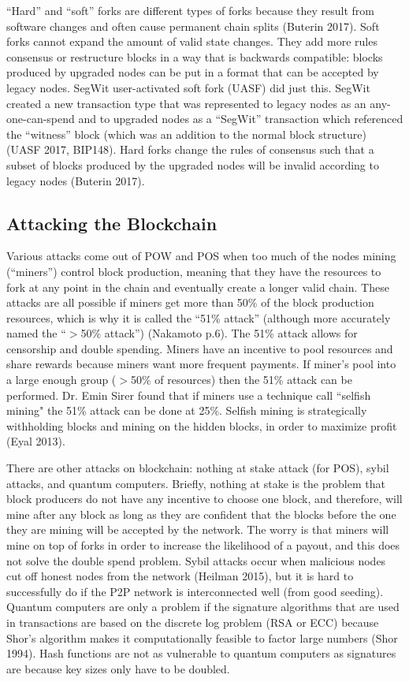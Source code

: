 \documentclass[letterpaper, 10 pt, conference]{ieeeconf}  %
\begin{document}
“Hard” and “soft” forks are different types of forks because they result from software changes and often cause permanent chain splits (Buterin 2017). Soft forks cannot expand the amount of valid state changes. They add more rules consensus or restructure blocks in a way that is backwards compatible: blocks produced by upgraded nodes can be put in a format that can be accepted by legacy nodes. SegWit user-activated soft fork (UASF) did just this. SegWit created a new transaction type that was represented to legacy nodes as an any-one-can-spend and to upgraded nodes as a “SegWit” transaction which referenced the “witness” block (which was an addition to the normal block structure) (UASF 2017, BIP148). Hard forks change the rules of consensus such that a subset of blocks produced by the upgraded nodes will be invalid according to legacy nodes (Buterin 2017). 

\subsection{Attacking the Blockchain}
Various attacks come out of POW and POS when too much of the nodes mining (“miners”) control block production, meaning that they have the resources to fork at any point in the chain and eventually create a longer valid chain. These attacks are all possible if miners get more than 50\% of the block production resources, which is why it is called the “51\% attack” (although more accurately named the “$>$50\% attack”) (Nakamoto p.6). The 51\% attack allows for censorship and double spending. Miners have an incentive to pool resources and share rewards because miners want more frequent payments. If miner’s pool into a large enough group ($>$50\% of resources) then the 51\% attack can be performed. Dr. Emin Sirer found that if miners use a technique call ``selfish mining" the 51\% attack can be done at 25\%. Selfish mining is strategically withholding blocks and mining on the hidden blocks, in order to maximize profit (Eyal 2013).

There are other attacks on blockchain: nothing at stake attack (for POS), sybil attacks, and quantum computers. Briefly, nothing at stake is the problem that block producers do not have any incentive to choose one block, and therefore, will mine after any block as long as they are confident that the blocks before the one they are mining will be accepted by the network. The worry is that miners will mine on top of forks in order to increase the likelihood of a payout, and this does not solve the double spend problem. Sybil attacks occur when malicious nodes cut off honest nodes from the network (Heilman 2015), but it is hard to successfully do if the P2P network is interconnected well (from good seeding). Quantum computers are only a problem if the signature algorithms that are used in transactions are based on the discrete log problem (RSA or ECC) because Shor’s algorithm makes it computationally feasible to factor large numbers (Shor 1994). Hash functions are not as vulnerable to quantum computers as signatures are because key sizes only have to be doubled. 
\end{document}

